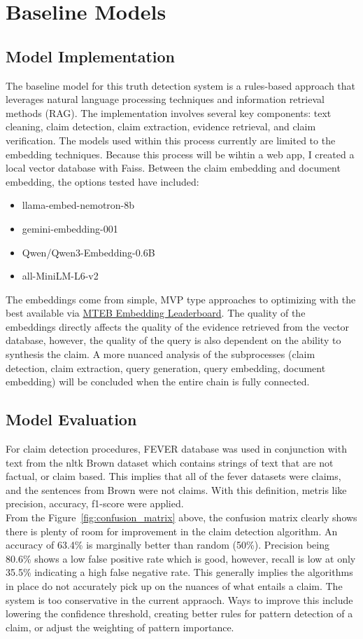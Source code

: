 \documentclass[11pt,letterpaper]{article}
\newcommand{\baselineModels}[2]{
    \section*{Baseline Models}
    \addcontentsline{toc}{section}{Baseline Models}
    \subsection*{Model Implementation}
    #1
    \subsection*{Model Evaluation}
    #2
}
\begin{document}
\baselineModels{
The baseline model for this truth detection system is a rules-based approach that leverages natural language processing techniques and information retrieval methods (RAG). The implementation involves several key components: text cleaning, claim detection, claim extraction, evidence retrieval, and claim verification. The models used within this process currently are limited to the embedding techniques. Because this process will be wihtin a web app, I created a local vector database with Faiss. Between the claim embedding and document embedding, the options tested have included:

\begin{itemize}
    \item llama-embed-nemotron-8b
    \item gemini-embedding-001
    \item Qwen/Qwen3-Embedding-0.6B
    \item all-MiniLM-L6-v2
\end{itemize}

The embeddings come from simple, MVP type approaches to optimizing with the best available via \href{https://huggingface.co/spaces/mteb/leaderboard}{MTEB Embedding Leaderboard}. The quality of the embeddings directly affects the quality of the evidence retrieved from the vector database, however, the quality of the query is also dependent on the ability to synthesis the claim. A more nuanced analysis of the subprocesses (claim detection, claim extraction, query generation, query embedding, document embedding) will be concluded when the entire chain is fully connected. \\

}
{


For claim detection procedures, FEVER database was used in conjunction with text from the nltk Brown dataset which contains strings of text that are not factual, or claim based. This implies that all of the fever datasets were claims, and the sentences from Brown were not claims. With this definition, metris like precision, accuracy, f1-score were applied. \\

From the Figure~\ref{fig:confusion_matrix} above, the confusion matrix clearly shows there is plenty of room for improvement in the claim detection algorithm. An accuracy of 63.4\% is marginally better than random (50\%). Precision being 80.6\% shows a low false positive rate which is good, however, recall is low at only 35.5\% indicating a high false negative rate. This generally implies the algorithms in place do not accurately pick up on the nuances of what entails a claim. The system is too conservative in the current appraoch. Ways to improve this include lowering the confidence threshold, creating better rules for pattern detection of a claim, or adjust the weighting of pattern importance. \\

}
\end{document}
